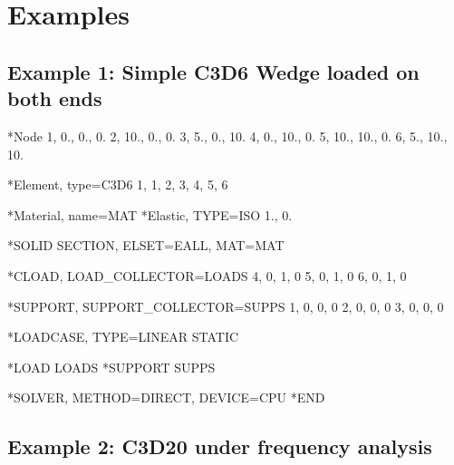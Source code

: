 \chapter{Examples}



\section{Example 1: Simple C3D6 Wedge loaded on both ends}
\begin{codeBlock}
*Node
1,  0.,  0.,  0.
2, 10.,  0.,  0.
3,  5.,  0.,  10.
4,  0., 10.,  0.
5, 10., 10.,  0.
6,  5., 10., 10.

*Element, type=C3D6
1,  1,  2,  3,  4,  5,  6

*Material, name=MAT
*Elastic, TYPE=ISO
1., 0.

*SOLID SECTION, ELSET=EALL, MAT=MAT

*CLOAD, LOAD_COLLECTOR=LOADS
4, 0, 1, 0
5, 0, 1, 0
6, 0, 1, 0

*SUPPORT, SUPPORT_COLLECTOR=SUPPS
1, 0, 0, 0
2, 0, 0, 0
3, 0, 0, 0

*LOADCASE, TYPE=LINEAR STATIC

*LOAD
LOADS
*SUPPORT
SUPPS

*SOLVER, METHOD=DIRECT, DEVICE=CPU
*END
\end{codeBlock}

\newpage

\section{Example 2: C3D20 under frequency analysis}

